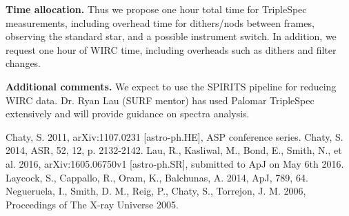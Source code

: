 \documentclass{article}
\begin{document}

\noindent \textbf{Time allocation.} Thus we propose one hour total time for TripleSpec measurements, including overhead time for dithers/nods between frames, observing the standard star, and a possible instrument switch. In addition, we request one hour of WIRC time, including overheads such as dithers and filter changes.

\noindent \textbf{Additional comments.}
We expect to use the SPIRITS pipeline for reducing WIRC data. Dr. Ryan Lau (SURF mentor) has used Palomar TripleSpec extensively and will provide guidance on spectra analysis. 

\vspace{-1ex}
\begin{thebibliography}{9}
	Chaty, S. 2011, arXiv:1107.0231 [astro-ph.HE], ASP conference series.
\vspace{-2ex}
	Chaty, S. 2014, ASR, 52, 12, p. 2132-2142.
\vspace{-2ex}
	Lau, R., Kasliwal, M., Bond, E., Smith, N., et al. 2016, arXiv:1605.06750v1 [astro-ph.SR], submitted to ApJ on May 6th 2016.
\vspace{-2ex}
	Laycock, S., Cappallo, R., Oram, K., Balchunas, A. 2014, ApJ, 789, 64.
\vspace{-2ex}
	Negueruela, I., Smith, D. M., Reig, P., Chaty, S., Torrejon, J. M. 2006, Proceedings of The X-ray Universe 2005.

\end{thebibliography}
\end{document}
